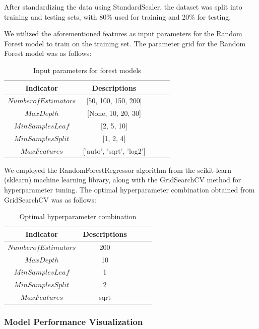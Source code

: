 \documentclass{mcmthesis}
\begin{document}
    After standardizing the data using StandardScaler, the dataset was split into training and testing sets, with 80\% used for training and 20\% for testing.

    We utilized the aforementioned features as input parameters for the Random Forest model to train on the training set. The parameter grid for the Random Forest model was as follows:
    \begin{table}[h] 
        \centering  
        \caption{Input parameters for forest models}  
        \label{tab1} 
    \begin{tabular}{ccccc} 
        \toprule[2pt]
        \textbf{Indicator}  & \textbf{Descriptions} \\    
        \midrule [1pt]
        $Number of Estimators$ & [50, 100, 150, 200]\\
        $Max Depth$ & [None, 10, 20, 30]\\
        $Min Samples Leaf$   & [2, 5, 10] \\
        $Min Samples Split$ & [1, 2, 4]\\
        $Max Features$ & ['auto', 'sqrt', 'log2']\\
        \bottomrule[2pt]
    \end{tabular}
    \end{table}

    We employed the RandomForestRegressor algorithm from the scikit-learn (sklearn) machine learning library, along with the GridSearchCV method for hyperparameter tuning. The optimal hyperparameter combination obtained from GridSearchCV was as follows:

    \begin{table}[h] 
        \centering  
        \caption{Optimal hyperparameter combination}  
        \label{tab1} 
    \begin{tabular}{ccccc} 
        \toprule[2pt]
        \textbf{Indicator}  & \textbf{Descriptions} \\    
        \midrule [1pt]
        $Number of Estimators$ & 200\\
        $Max Depth$ & 10\\
        $Min Samples Leaf$   & 1 \\
        $Min Samples Split$ & 2\\
        $Max Features$ & sqrt\\
        \bottomrule[2pt]
    \end{tabular}
    \end{table}

\subsubsection{Model Performance Visualization}
\end{document}
